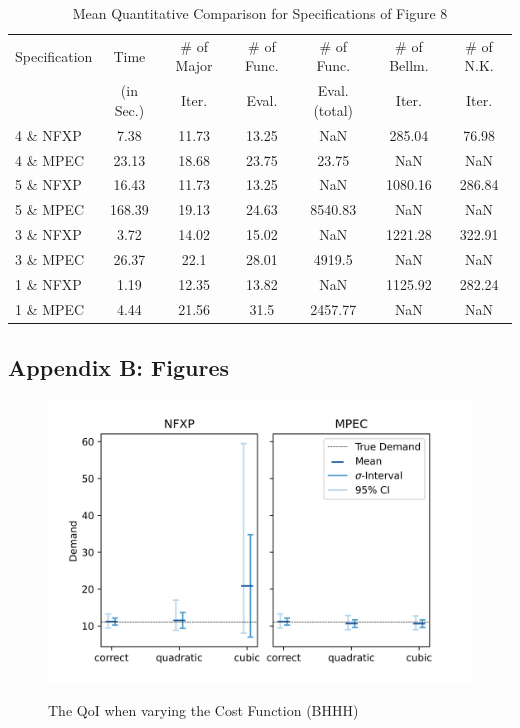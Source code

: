 \begin{table}[H]
	\centering
	\caption{Mean Quantitative Comparison for Specifications of Figure 8}
	\label{table4}
	\begin{tabular}{l | c c c c c c}
		\toprule\midrule
		Specification & Time & \# of Major & \# of Func. & \# of Func. & \# of Bellm. & \# of N.K.   \\
		& (in Sec.) & Iter. & Eval. & Eval. (total) & Iter. & Iter. \\
		\midrule
		4 \& NFXP & 7.38 & 11.73 &	13.25 &	NaN & 285.04 & 76.98 \\
		4 \& MPEC & 23.13 & 18.68 & 23.75 & 23.75 & NaN & NaN \\
		5 \& NFXP & 16.43 &  11.73 & 13.25 & NaN & 1080.16 & 286.84 \\
		5 \& MPEC & 168.39 & 19.13 &	24.63 &	8540.83 & NaN &	NaN \\
		3 \& NFXP & 3.72 & 14.02 & 15.02 & NaN &	1221.28 & 322.91 \\
		3 \& MPEC & 26.37 & 22.1 & 28.01 & 4919.5 & NaN & NaN \\
		1 \& NFXP & 1.19 & 12.35 & 13.82 & NaN &	1125.92 & 282.24 \\
		1 \& MPEC & 4.44 & 21.56 & 31.5 & 2457.77 & NaN & NaN \\
		\bottomrule
	\end{tabular}
\end{table}

\newpage
\subsection{Appendix B: Figures}

\begin{figure}[H]
	\caption{The QoI when varying the Cost Function (BHHH)}
	\vspace*{-4mm}
	\centering
	\includegraphics[scale=0.9]{../figures/figure_12.png}
	\label{figure12}
\end{figure}

